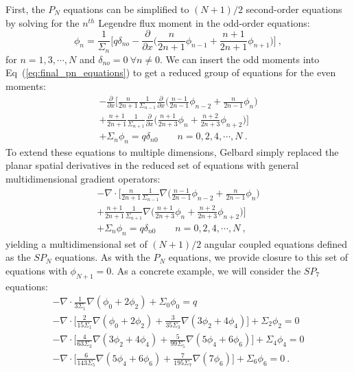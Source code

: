First, the $P_N$ equations can be simplified to $(N+1)/2$ second-order
equations by solving for the $n^{th}$ Legendre flux moment in the
odd-order equations:
\begin{equation}
  \phi_n = \frac{1}{\Sigma_n}\Bigg[ q \delta_{no} -
    \frac{\partial}{\partial x}\Big(\frac{n}{2n+1}\phi_{n-1} +
    \frac{n+1}{2n+1} \phi_{n+1} \Big) \Bigg]\:, 
  \label{eq:odd_moments}
\end{equation}
for $n = 1,3,\cdots,N$ and $\delta_{no} = 0\ \forall n \neq 0$. We can
insert the odd moments into Eq~(\ref{eq:final_pn_equations}) to get a
reduced group of equations for the even moments:
\begin{multline}
  -\frac{\partial}{\partial x}
  \Bigg[\frac{n}{2n+1}\frac{1}{\Sigma_{n-1}} \frac{\partial}{\partial
      x} \Big(\frac{n-1}{2n-1} \phi_{n-2} + \frac{n}{2n-1}\phi_n \Big)
    \\+ \frac{n+1}{2n+1}\frac{1}{\Sigma_{n+1}} \frac{\partial}{\partial
      x} \Big(\frac{n+1}{2n+3}\phi_n + \frac{n+2}{2n+3}\phi_{n+2}\Big)
    \Bigg] \\+ \Sigma_n \phi_n = q \delta_{n0}\ \ \ \ \ \ \ \ \ n =
  0,2,4,\cdots,N\:.
  \label{eq:reduced_pn}
\end{multline}
To extend these equations to multiple dimensions, Gelbard simply
replaced the planar spatial derivatives in the reduced set of
equations with general multidimensional gradient operators:
\begin{multline}
  -\nabla \cdot \Bigg[\frac{n}{2n+1}\frac{1}{\Sigma_{n-1}} \nabla
    \Big(\frac{n-1}{2n-1} \phi_{n-2} + \frac{n}{2n-1}\phi_n \Big) \\+
    \frac{n+1}{2n+1}\frac{1}{\Sigma_{n+1}} \nabla
    \Big(\frac{n+1}{2n+3}\phi_n + \frac{n+2}{2n+3}\phi_{n+2}\Big)
    \Bigg] \\+ \Sigma_n \phi_n = q \delta_{n0}\ \ \ \ \ \ \ \ \ n =
  0,2,4,\cdots,N\:,
  \label{eq:spn_equations}
\end{multline}
yielding a multidimensional set of $(N+1)/2$ angular coupled equations
defined as the $SP_N$ equations. As with the $P_N$ equations, we
provide closure to this set of equations with $\phi_{N+1} = 0$. As a
concrete example, we will consider the $SP_7$ equations:
\begin{subequations}
  \begin{gather}
    -\nabla \cdot \frac{1}{3 \Sigma_1} \nabla ( \phi_0 + 2\phi_2 ) +
    \Sigma_0 \phi_0 = q \\ 
    -\nabla \cdot \Bigg[ \frac{2}{15 \Sigma_1} \nabla ( \phi_0 + 2\phi_2
      ) + \frac{3}{35 \Sigma_3}\nabla( 3\phi_2 + 4\phi_4)\Bigg] +
    \Sigma_2 \phi_2 = 0\\
    -\nabla \cdot \Bigg[ \frac{4}{63 \Sigma_3} \nabla ( 3\phi_2 +
      4\phi_4 ) + \frac{5}{99 \Sigma_5}\nabla( 5\phi_4 +
      6\phi_6)\Bigg] + \Sigma_4 \phi_4 = 0\\
    -\nabla \cdot \Bigg[ \frac{6}{143 \Sigma_5} \nabla ( 5\phi_4 +
      6\phi_6 ) + \frac{7}{195 \Sigma_7}\nabla(7\phi_6)\Bigg] +
    \Sigma_6 \phi_6 = 0 \:.
  \end{gather}
  \label{eq:sp7_equations}
\end{subequations}
